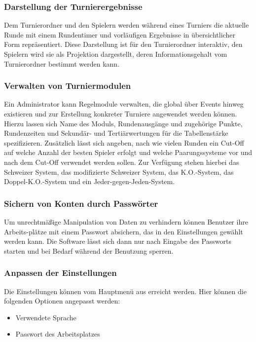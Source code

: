 \documentclass[11pt]{article}
\begin{document}
\subsubsection{Darstellung der Turnierergebnisse}

Dem Turnierordner und den Spielern werden während eines Turniers die aktuelle Runde mit einem Rundentimer und vorläufigen Ergebnisse in übersichtlicher Form repräsentiert. Diese Darstellung ist für den Turnierordner interaktiv, den Spielern wird sie als Projektion dargestellt, deren Informationsgehalt vom Turnierordner bestimmt werden kann.

\newpage

\subsubsection{Verwalten von Turniermodulen}

Ein Administrator kann Regelmodule verwalten, die global über Events hinweg existieren und zur Erstellung konkreter Turniere angewendet werden können. Hierzu lassen sich Name des Moduls, Rundenausgänge und zugehörige Punkte, Rundenzeiten und Sekundär- und Tertiärwertungen für die Tabellenstärke spezifizieren. Zusätzlich lässt sich angeben, nach wie vielen Runden ein Cut-Off auf welche Anzahl der besten Spieler erfolgt und welche Paarungssysteme vor und nach dem Cut-Off verwendet werden sollen. Zur Verfügung stehen hierbei das Schweizer System, das modifizierte Schweizer System, das K.O.-System, das Doppel-K.O.-System und ein Jeder-gegen-Jeden-System.

\subsubsection{Sichern von Konten durch Passwörter}

Um unrechtmäßige Manipulation von Daten zu verhindern können Benutzer ihre Arbeits-plätze mit einem Passwort absichern, das in den Einstellungen gewählt werden kann. Die Software lässt sich dann nur nach Eingabe des Passworts starten und bei Bedarf während der Benutzung sperren.

\subsubsection{Anpassen der Einstellungen}

Die Einstellungen können vom Hauptmenü aus erreicht werden. Hier können die folgenden Optionen angepasst werden:
\begin{itemize}
	\item Verwendete Sprache
	\item Passwort des Arbeitsplatzes
\end{itemize}
\end{document}

